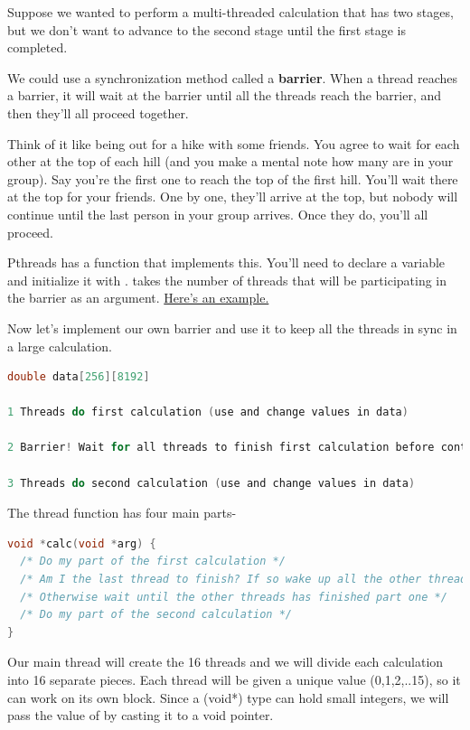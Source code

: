 Suppose we wanted to perform a multi-threaded calculation that has two stages, but we don't want to advance to the second stage until the first stage is completed.

We could use a synchronization method called a \textbf{barrier}. When a thread reaches a barrier, it will wait at the barrier until all the threads reach the barrier, and then they'll all proceed together.

Think of it like being out for a hike with some friends. You agree to wait for each other at the top of each hill (and you make a mental note how many are in your group). Say you're the first one to reach the top of the first hill. You'll wait there at the top for your friends. One by one, they'll arrive at the top, but nobody will continue until the last person in your group arrives. Once they do, you'll all proceed.

Pthreads has a function  that implements this. You'll need to declare a  variable and initialize it with .  takes the number of threads that will be participating in the barrier as an argument. \href{https://github.com/angrave/SystemProgramming/wiki/Sample-program-using-pthread-barriers}{Here's an example.}

Now let's implement our own barrier and use it to keep all the threads in sync in a large calculation.

\begin{lstlisting}[language=C]
double data[256][8192]

1 Threads do first calculation (use and change values in data)

2 Barrier! Wait for all threads to finish first calculation before continuing

3 Threads do second calculation (use and change values in data)
\end{lstlisting}

The thread function has four main parts-

\begin{lstlisting}[language=C]
void *calc(void *arg) {
  /* Do my part of the first calculation */
  /* Am I the last thread to finish? If so wake up all the other threads! */
  /* Otherwise wait until the other threads has finished part one */
  /* Do my part of the second calculation */
}
\end{lstlisting}

Our main thread will create the 16 threads and we will divide each calculation into 16 separate pieces. Each thread will be given a unique value (0,1,2,..15), so it can work on its own block. Since a (void*) type can hold small integers, we will pass the value of  by casting it to a void pointer.

